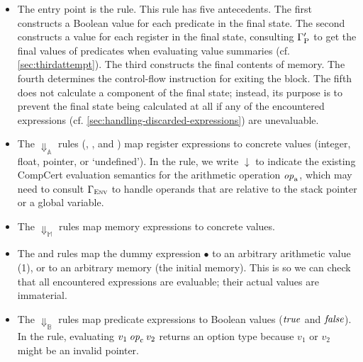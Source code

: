{\begin{itemize}

\item The entry point is the  rule. This rule has five
  antecedents. The first constructs a Boolean value for each predicate in the
  final state. The second constructs a value for each register in the final
  state, consulting $\Gamma'_{\mathrm{P}}$ to get the final values of
  predicates when evaluating value summaries (cf. \cref{sec:thirdattempt}). The
  third constructs the final contents of memory. The fourth determines the
  control-flow instruction for exiting the block. The fifth does not calculate a
  component of the final state; instead, its purpose is to prevent the final
  state being calculated at all if any of the encountered expressions
  (cf. \cref{sec:handling-discarded-expressions}) are unevaluable.

\item The $\Downarrow_{\mathbb{A}}$ rules (,
  , and ) map register expressions to
  concrete values (integer, float, pointer, or `undefined'). In the
   rule, we write $\downarrow$ to indicate the existing
  CompCert evaluation semantics for the arithmetic operation $\mathit{op}_{\mathrm{a}}$, which
  may need to consult $\Gamma_{\mathrm{\textsc{Env}}}$ to handle operands that are
  relative to the stack pointer or a global variable.

\item The $\Downarrow_{\mathbb{M}}$ rules map memory expressions to concrete
  values.

\item The  and  rules map the
  dummy expression $\bullet$ to an arbitrary arithmetic value (1), or to an
  arbitrary memory (the initial memory). This is so we can check that all
  encountered expressions are evaluable; their actual values are immaterial.

\item The $\Downarrow_{\mathbb{B}}$ rules map predicate expressions to Boolean
  values ($\mathit{true}$ and $\mathit{false}$). In the  rule,
  evaluating $v_1\mathbin{\mathit{op}_{\mathrm{c}}}v_2$ returns an option type because $v_1$ or
  $v_2$ might be an invalid pointer.


\end{itemize}}
